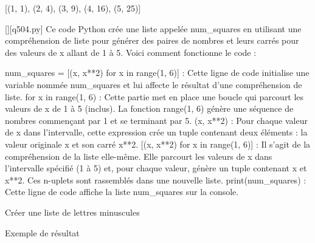 [(1, 1), (2, 4), (3, 9), (4, 16), (5, 25)]
        \par
        \begin{solution}
            \renewcommand{\nomfichier}{q504.py}
            \pythonfile{\chemincode \nomfichier}[][\nomfichier]
            Ce code Python crée une liste appelée num_squares en utilisant une compréhension de liste pour générer des paires de nombres et leurs carrés pour des valeurs de x allant de 1 à 5. Voici comment fonctionne le code :

    num_squares = [(x, x**2) for x in range(1, 6)] : Cette ligne de code initialise une variable nommée num_squares et lui affecte le résultat d'une compréhension de liste.
        for x in range(1, 6) : Cette partie met en place une boucle qui parcourt les valeurs de x de 1 à 5 (inclus). La fonction range(1, 6) génère une séquence de nombres commençant par 1 et se terminant par 5.
        (x, x**2) : Pour chaque valeur de x dans l'intervalle, cette expression crée un tuple contenant deux éléments : la valeur originale x et son carré x**2.
        [(x, x**2) for x in range(1, 6)] : Il s'agit de la compréhension de la liste elle-même. Elle parcourt les valeurs de x dans l'intervalle spécifié (1 à 5) et, pour chaque valeur, génère un tuple contenant x et x**2. Ces n-uplets sont rassemblés dans une nouvelle liste.
    print(num_squares) : Cette ligne de code affiche la liste num_squares sur la console.
        \end{solution}
        

        \question
        Créer une liste de lettres minuscules

Exemple de résultat

